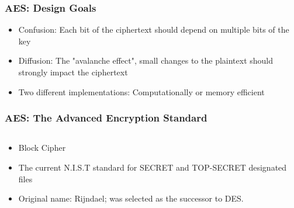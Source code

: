 \documentclass[12pt]{beamer}
\begin{document}
\begin{frame}
\frametitle{AES: Design Goals}
\begin{itemize}
\item Confusion: Each bit of the ciphertext should depend on multiple bits of the key
\item Diffusion: The "avalanche effect", small changes to the plaintext should strongly impact the ciphertext
\item Two different implementations: Computationally or memory efficient
\end{itemize}
\end{frame}

\begin{frame}
\frametitle{AES: The Advanced Encryption Standard}
\begin{columns}
\begin{column}{0.5\textwidth}
\begin{itemize}
\item Block Cipher
\item The current N.I.S.T standard for SECRET and TOP-SECRET designated files
\item Original name: Rijndael; was selected as the successor to DES.
\end{itemize}
\end{column}
\begin{column}{0.5\textwidth}
\begin{center}
\end{center}
\end{column}
\end{columns}
\end{frame}
\end{document}
